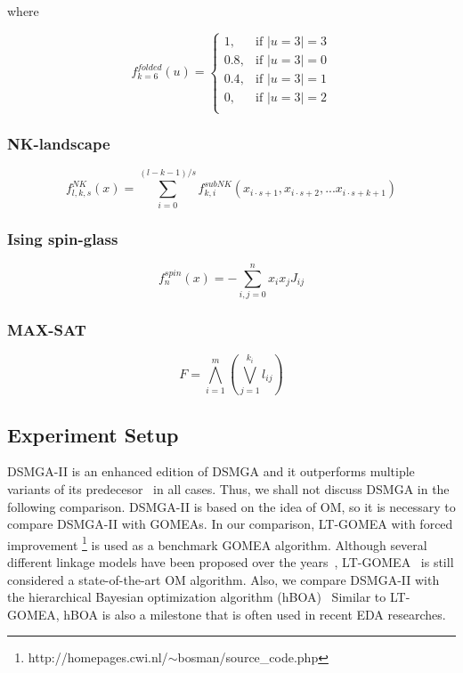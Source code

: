 \documentclass{sig-alternate-05-2015}
\begin{document}
where

\begin{displaymath}
f_{k=6}^{folded}(u) = 
   \begin{cases}
    1, 		& \text{if $|u=3| = 3$} \\
    0.8, 	& \text{if $|u=3| = 0$} \\
    0.4, 	& \text{if $|u=3| = 1$} \\
    0, 		& \text{if $|u=3| = 2$} \\
	\end{cases}
\end{displaymath}


\subsubsection{NK-landscape}

\begin{displaymath}
f_{l,k,s}^{NK}(x) = \sum_{i=0}^{(l-k-1)/s} f_{k,i}^{subNK} (x_{i{\cdot}s+1},x_{i{\cdot}s+2},...x_{i{\cdot}s+k+1})
\end{displaymath}


\subsubsection{Ising spin-glass}

\begin{displaymath}
f_{n}^{spin}(x) = -\sum_{i,j=0}^{n} x_{i}x_{j}J_{ij}
\end{displaymath}

\subsubsection{MAX-SAT}

\begin{displaymath}
F = \bigwedge_{i=1}^{m} \left (\bigvee_{j=1}^{k_{i}} l_{ij} \right )
\end{displaymath}


\subsection{Experiment Setup}
DSMGA-II is an enhanced edition of DSMGA and it outperforms multiple variants of its predecesor~\cite{yu:DSMGA} in all cases. 
Thus, we shall not discuss DSMGA in the following comparison.
DSMGA-II is based on the idea of OM, so it is necessary to compare DSMGA-II with GOMEAs. 
In our comparison, LT-GOMEA with forced improvement \footnote{http://homepages.cwi.nl/$\sim$bosman/source\_code.php} is used as a benchmark GOMEA algorithm.
Although several different linkage models have been proposed over the years~\cite{bosman:robust}, LT-GOMEA~\cite{bosman:LT-GOMEA} is still considered a state-of-the-art OM algorithm.
Also, we compare DSMGA-II with the hierarchical Bayesian optimization algorithm (hBOA)~\cite{pelikan:hBOA}
Similar to LT-GOMEA, hBOA is also a milestone that is often used in recent EDA researches.
\end{document}
